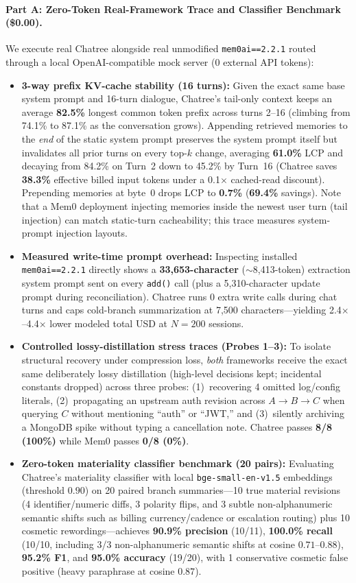 \documentclass[10pt,twocolumn]{article}
\begin{document}
\paragraph{Part A: Zero-Token Real-Framework Trace and Classifier Benchmark (\$0.00).}
We execute real Chatree alongside real unmodified \texttt{mem0ai==2.2.1} routed through a local OpenAI-compatible mock server (0 external API tokens):
\begin{itemize}
  \item \textbf{3-way prefix KV-cache stability (16 turns):} Given the exact same base system prompt and 16-turn dialogue, Chatree's tail-only context keeps an average \textbf{82.5\%} longest common token prefix across turns 2--16 (climbing from 74.1\% to 87.1\% as the conversation grows). Appending retrieved memories to the \emph{end} of the static system prompt preserves the system prompt itself but invalidates all prior turns on every top-$k$ change, averaging \textbf{61.0\%} LCP and decaying from 84.2\% on Turn~2 down to 45.2\% by Turn~16 (Chatree saves \textbf{38.3\%} effective billed input tokens under a 0.1$\times$ cached-read discount). Prepending memories at byte~0 drops LCP to \textbf{0.7\%} (\textbf{69.4\%} savings). Note that a Mem0 deployment injecting memories inside the newest user turn (tail injection) can match static-turn cacheability; this trace measures system-prompt injection layouts.
  \item \textbf{Measured write-time prompt overhead:} Inspecting installed \texttt{mem0ai==2.2.1} directly shows a \textbf{33,653-character} ($\sim$8,413-token) extraction system prompt sent on every \texttt{add()} call (plus a 5,310-character update prompt during reconciliation). Chatree runs 0 extra write calls during chat turns and caps cold-branch summarization at 7,500 characters—yielding 2.4$\times$--4.4$\times$ lower modeled total USD at $N=200$ sessions.
  \item \textbf{Controlled lossy-distillation stress traces (Probes 1--3):} To isolate structural recovery under compression loss, \emph{both} frameworks receive the exact same deliberately lossy distillation (high-level decisions kept; incidental constants dropped) across three probes: (1)~recovering 4 omitted log/config literals, (2)~propagating an upstream auth revision across $A \to B \to C$ when querying $C$ without mentioning ``auth'' or ``JWT,'' and (3)~silently archiving a MongoDB spike without typing a cancellation note. Chatree passes \textbf{8/8 (100\%)} while Mem0 passes \textbf{0/8 (0\%)}.
  \item \textbf{Zero-token materiality classifier benchmark (20 pairs):} Evaluating Chatree's materiality classifier with local \texttt{bge-small-en-v1.5} embeddings (threshold $0.90$) on 20 paired branch summaries—10 true material revisions (4 identifier/numeric diffs, 3 polarity flips, and 3 subtle non-alphanumeric semantic shifts such as billing currency/cadence or escalation routing) plus 10 cosmetic rewordings—achieves \textbf{90.9\% precision} (10/11), \textbf{100.0\% recall} (10/10, including 3/3 non-alphanumeric semantic shifts at cosine $0.71$--$0.88$), \textbf{95.2\% F1}, and \textbf{95.0\% accuracy} (19/20), with 1 conservative cosmetic false positive (heavy paraphrase at cosine $0.87$).

\end{itemize}
\end{document}
